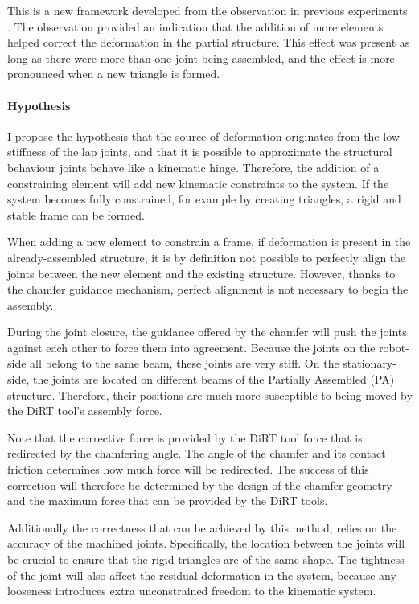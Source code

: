 This is a new framework developed from the observation in previous experiments . The observation provided an indication that the addition of more elements helped correct the deformation in the partial structure. This effect was present as long as there were more than one joint being assembled, and the effect is more pronounced when a new triangle is formed. 

\paragraph{Hypothesis}

I propose the hypothesis that the source of deformation originates from the low stiffness of the lap joints, and that it is possible to approximate the structural behaviour joints behave like a kinematic hinge. Therefore, the addition of a constraining element will add new kinematic constraints to the system. If the system becomes fully constrained, for example by creating triangles, a rigid and stable frame can be formed.

When adding a new element to constrain a frame, if deformation is present in the already-assembled structure, it is by definition not possible to perfectly align the joints between the new element and the existing structure. However, thanks to the chamfer guidance mechanism, perfect alignment is not necessary to begin the assembly.

During the joint closure, the guidance offered by the chamfer will push the joints against each other to force them into agreement. Because the joints on the robot-side all belong to the same beam, these joints are very stiff. On the stationary-side, the joints are located on different beams of the Partially Assembled (PA) structure. Therefore, their positions are much more susceptible to being moved by the DiRT tool's assembly force. 

Note that the corrective force is provided by the DiRT tool force that is redirected by the chamfering angle. The angle of the chamfer and its contact friction determines how much force will be redirected. The success of this correction will therefore be determined by the design of the chamfer geometry and the maximum force that can be provided by the DiRT tools. 

Additionally the correctness that can be achieved by this method, relies on the accuracy of the machined joints. Specifically, the location between the joints will be crucial to ensure that the rigid triangles are of the same shape. The tightness of the joint will also affect the residual deformation in the system, because any looseness introduces extra unconstrained freedom to the kinematic system. 

